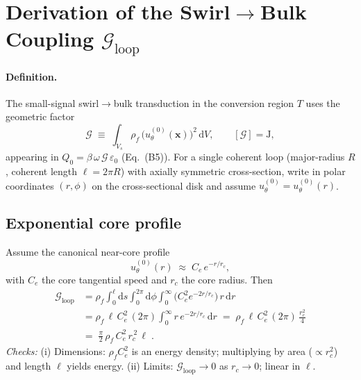 \documentclass[10pt,reprint,aps,onecolumn,nofootinbib]{revtex4-2}
\begin{document}
    \appendix
    \section{Derivation of the Swirl$\to$Bulk Coupling \texorpdfstring{$\mathcal{G}_{\text{loop}}$}{G\_loop}}
    \label{app:Gloop}

    \paragraph{Definition.}
        The small-signal swirl$\to$bulk transduction in the conversion region $T$ uses the geometric factor
        \begin{equation}
            \mathcal{G}\;\equiv\;\int_{V_s}\rho_f\,\big(u_\theta^{(0)}(\mathbf{x})\big)^2\,\mathrm{d}V,
            \qquad [\mathcal{G}]=\mathrm{J},
            \label{eq:A1}
        \end{equation}
        appearing in $Q_0=\beta\,\omega\,\mathcal{G}\,\varepsilon_0$ (Eq.~\textup{(B5)}). For a single coherent loop (major-radius $R$, coherent length $\ell=2\pi R$) with axially symmetric cross-section, write in polar coordinates $(r,\phi)$ on the cross-sectional disk and assume $u_\theta^{(0)}=u_\theta^{(0)}(r)$.

    \subsection*{Exponential core profile}
    Assume the canonical near-core profile
    \begin{equation}
        u_\theta^{(0)}(r)\;\approx\;C_e\,e^{-r/r_c},
        \label{eq:A2}
    \end{equation}
    with $C_e$ the core tangential speed and $r_c$ the core radius. Then
    \begin{align}
        \mathcal{G}_{\text{loop}}
        &= \rho_f \int_0^\ell\!\mathrm{d}s\!\int_0^{2\pi}\!\mathrm{d}\phi\!\int_0^\infty\!\big(C_e^2 e^{-2r/r_c}\big)\,r\,\mathrm{d}r
        \label{eq:A3}\\[3pt]
        &= \rho_f\,\ell\,C_e^2\,(2\pi)\int_0^\infty r\,e^{-2r/r_c}\,\mathrm{d}r
        \;=\; \rho_f\,\ell\,C_e^2\,(2\pi)\,\frac{r_c^2}{4}\nonumber\\[2pt]
        &=\boxed{\;\frac{\pi}{2}\,\rho_f\,C_e^2\,r_c^{\,2}\,\ell\;}.
        \label{eq:A4}
    \end{align}
    \emph{Checks:} (i) Dimensions: $\rho_f C_e^2$ is an energy density; multiplying by area ($\propto r_c^2$) and length $\ell$ yields energy. (ii) Limits: $\mathcal{G}_{\text{loop}}\to 0$ as $r_c\to 0$; linear in $\ell$.
\end{document}

